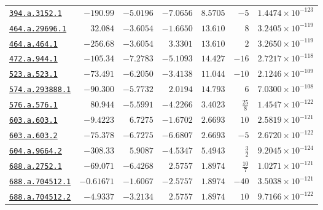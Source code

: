 \documentclass[10pt]{article}
\begin{document}
\begin{landscape}
\begin{longtable}{@{}lrrrrrr@{}}
\href{https://www.lmfdb.org/Genus2Curve/Q/394/a/3152/1}{\texttt{394.a.3152.1}} & $-190.99$ & $-5.0196$ & $-7.0656$ & $8.5705$ & $-5$ & $1.4474\times 10^{-123}$ \\
\href{https://www.lmfdb.org/Genus2Curve/Q/464/a/29696/1}{\texttt{464.a.29696.1}} & $32.084$ & $-3.6054$ & $-1.6650$ & $13.610$ & $8$ & $3.2405\times 10^{-119}$ \\
\href{https://www.lmfdb.org/Genus2Curve/Q/464/a/464/1}{\texttt{464.a.464.1}} & $-256.68$ & $-3.6054$ & $3.3301$ & $13.610$ & $2$ & $3.2650\times 10^{-119}$ \\
\href{https://www.lmfdb.org/Genus2Curve/Q/472/a/944/1}{\texttt{472.a.944.1}} & $-105.34$ & $-7.2783$ & $-5.1093$ & $14.427$ & $-16$ & $2.7217\times 10^{-118}$ \\
\href{https://www.lmfdb.org/Genus2Curve/Q/523/a/523/1}{\texttt{523.a.523.1}} & $-73.491$ & $-6.2050$ & $-3.4138$ & $11.044$ & $-10$ & $2.1246\times 10^{-109}$ \\
\href{https://www.lmfdb.org/Genus2Curve/Q/574/a/293888/1}{\texttt{574.a.293888.1}} & $-90.300$ & $-5.7732$ & $2.0194$ & $14.793$ & $6$ & $7.0300\times 10^{-108}$ \\
\href{https://www.lmfdb.org/Genus2Curve/Q/576/a/576/1}{\texttt{576.a.576.1}} & $80.944$ & $-5.5991$ & $-4.2266$ & $3.4023$ & $\frac{25}{8}$ & $1.4547\times 10^{-122}$ \\
\href{https://www.lmfdb.org/Genus2Curve/Q/603/a/603/1}{\texttt{603.a.603.1}} & $-9.4223$ & $6.7275$ & $-1.6702$ & $2.6693$ & $10$ & $2.5819\times 10^{-121}$ \\
\href{https://www.lmfdb.org/Genus2Curve/Q/603/a/603/2}{\texttt{603.a.603.2}} & $-75.378$ & $-6.7275$ & $-6.6807$ & $2.6693$ & $-5$ & $2.6720\times 10^{-122}$ \\
\href{https://www.lmfdb.org/Genus2Curve/Q/604/a/9664/2}{\texttt{604.a.9664.2}} & $-308.33$ & $5.9087$ & $-4.5347$ & $5.4943$ & $\frac{3}{2}$ & $9.2045\times 10^{-124}$ \\
\href{https://www.lmfdb.org/Genus2Curve/Q/688/a/2752/1}{\texttt{688.a.2752.1}} & $-69.071$ & $-6.4268$ & $2.5757$ & $1.8974$ & $\frac{10}{7}$ & $1.0271\times 10^{-121}$ \\
\href{https://www.lmfdb.org/Genus2Curve/Q/688/a/704512/1}{\texttt{688.a.704512.1}} & $-0.61671$ & $-1.6067$ & $-2.5757$ & $1.8974$ & $-40$ & $3.5038\times 10^{-121}$ \\
\href{https://www.lmfdb.org/Genus2Curve/Q/688/a/704512/2}{\texttt{688.a.704512.2}} & $-4.9337$ & $-3.2134$ & $2.5757$ & $1.8974$ & $10$ & $9.7166\times 10^{-122}$ \\

\end{longtable}
\end{landscape}
\end{document}
